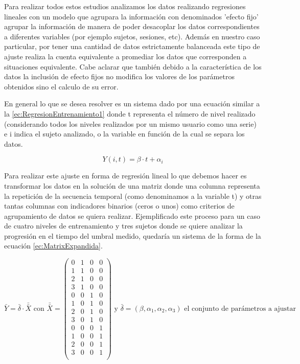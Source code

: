 \documentclass{article}
\numberwithin{figure}{section}
\begin{document}
    Para realizar todos estos estudios analizamos los datos realizando regresiones lineales con un modelo que agrupara la información con denominados 'efecto fijo' agrupar la información de manera de poder desacoplar los datos correspondientes a diferentes variables (por ejemplo sujetos, sesiones, etc). Además en nuestro caso particular, por tener una cantidad de datos estrictamente balanceada este tipo de ajuste realiza la cuenta equivalente a promediar los datos que corresponden a situaciones equivalente. Cabe aclarar que también debido a la característica de los datos la inclusión de efecto fijos no modifica los valores de los parámetros obtenidos sino el calculo de su error. 
    
    En general lo que se desea resolver es un sistema dado por una ecuación similar a la  \ref{ec:RegresionEntrenamiento1} donde t representa el número de nivel realizado (considerando todos los niveles realizados por un mismo usuario como una serie) e i indica el sujeto analizado, o la variable en función de la cual se separa los datos.
    
    \begin{equation} \label{ec:RegresionEntrenamiento1}
        Y(i,t) = \beta \cdot t + \alpha_i
    \end{equation}
    
    Para realizar este ajuste en forma de regresión lineal lo que debemos hacer es transformar los datos en la solución de una matriz donde una columna representa la repetición de la secuencia temporal (como denominamos a la variable t) y otras tantas columnas con indicadores binarios (ceros o unos) como criterios de agrupamiento de datos se quiera realizar. Ejemplificado este proceso para un caso de cuatro niveles de entrenamiento y tres sujetos donde se quiere analizar la progresión en el tiempo del umbral medido, quedaría un sistema de la forma de la ecuación \ref{ec:MatrixExpandida}.

    \begin{equation} \label{ec:MatrixExpandida}
    \bar {Y} = \bar{\delta} \cdot \bar{\bar{X}} \text{ con } \bar{\bar{X}} =
     \begin{pmatrix}
        0 & 1 & 0 & 0\\
        1 & 1 & 0 & 0\\
        2 & 1 & 0 & 0\\
        3 & 1 & 0 & 0\\
        0 & 0 & 1 & 0\\
        1 & 0 & 1 & 0\\
        2 & 0 & 1 & 0\\
        3 & 0 & 1 & 0\\
        0 & 0 & 0 & 1\\
        1 & 0 & 0 & 1\\
        2 & 0 & 0 & 1\\
        3 & 0 & 0 & 1\\
     \end{pmatrix} \text{ y $\bar{\delta}=(\beta,\alpha_1,\alpha_2,\alpha_3)$ el conjunto de parámetros a ajustar}
 \end{equation}
 
\end{document}
